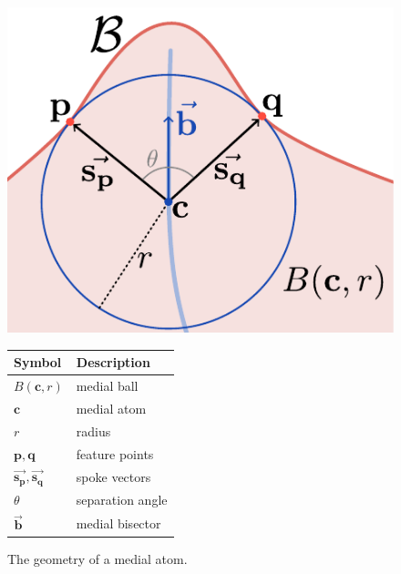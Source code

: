 \begin{figure}[tbp]
	\centering
	\begin{minipage}[c]{0.4\linewidth}
		\includegraphics[width=\linewidth]{figs/medial_atom_geometry.pdf}
	\end{minipage}
	\begin{minipage}[c]{0.45\textwidth}
		\centering
		\begin{tabular}{ll}
			\toprule
			Symbol & Description \\
			\midrule
			$B(\mathbf{c},r)$& medial ball\\
			$\mathbf{c}$ & medial atom\\
			$r$ & radius\\
			$\mathbf{p}, \mathbf{q}$ & feature points\\
			$\vec{\mathbf{s_{p}}}, \vec{\mathbf{s_{q}}}$ & spoke vectors\\
			$\theta$ & separation angle\\
			$\vec{\mathbf{b}}$ & medial bisector\\
			\bottomrule
		\end{tabular}
	\end{minipage}
	\caption{The geometry of a medial atom.}
	\label{fig:medialgeometry}
\end{figure}

